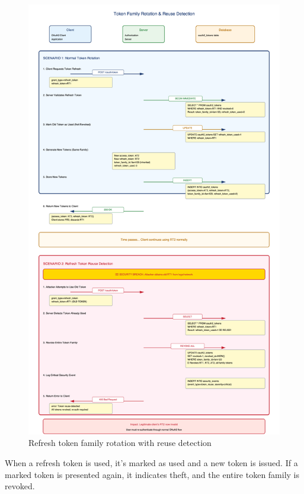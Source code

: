 \documentclass[12pt,a4paper]{article}
\begin{document}
\begin{figure}[H]
    \centering
    \includegraphics[width=\textwidth,height=0.85\textheight,keepaspectratio]{diagrams/14_token_family_rotation.png}
    \caption{Refresh token family rotation with reuse detection}
    \label{fig:token_rotation}
\end{figure}

When a refresh token is used, it's marked as used and a new token is issued. If a marked token is presented again, it indicates theft, and the entire token family is revoked.
\end{document}
